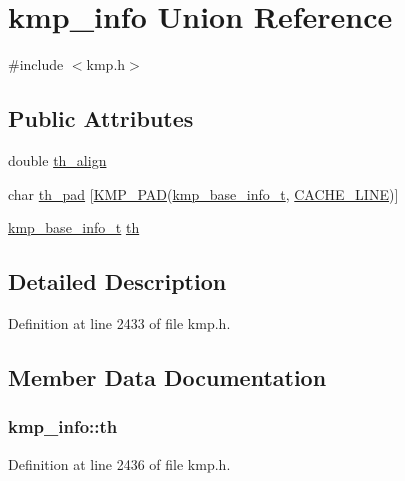 \hypertarget{unionkmp__info}{\section{kmp\-\_\-info Union Reference}
\label{unionkmp__info}
}


{\ttfamily \#include $<$kmp.\-h$>$}

\subsection*{Public Attributes}
\begin{DoxyCompactItemize}
\item 
double \hyperlink{unionkmp__info_a816bfe419e64ada867f448d2df78064d}{th\-\_\-align}
\item 
char \hyperlink{unionkmp__info_a75cad87b55644b8444fb04cb630abc74}{th\-\_\-pad} \mbox{[}\hyperlink{kmp__lock_8h_a7e782410115489f45ab1686c39a2bb89}{K\-M\-P\-\_\-\-P\-A\-D}(\hyperlink{kmp_8h_aa3e9bd85130c43e1771519d5eda9d86f}{kmp\-\_\-base\-\_\-info\-\_\-t}, \hyperlink{kmp__os_8h_a86194c659a2d795e5f5949d293ae4661}{C\-A\-C\-H\-E\-\_\-\-L\-I\-N\-E})\mbox{]}
\item 
\hyperlink{kmp_8h_aa3e9bd85130c43e1771519d5eda9d86f}{kmp\-\_\-base\-\_\-info\-\_\-t} \hyperlink{unionkmp__info_a0a5a5e60beda6bf019575e45ef6f5286}{th}
\end{DoxyCompactItemize}


\subsection{Detailed Description}


Definition at line 2433 of file kmp.\-h.



\subsection{Member Data Documentation}
\hypertarget{unionkmp__info_a0a5a5e60beda6bf019575e45ef6f5286}{
\subsubsection[{th}]{ kmp\-\_\-info\-::th}}\label{unionkmp__info_a0a5a5e60beda6bf019575e45ef6f5286}


Definition at line 2436 of file kmp.\-h.

